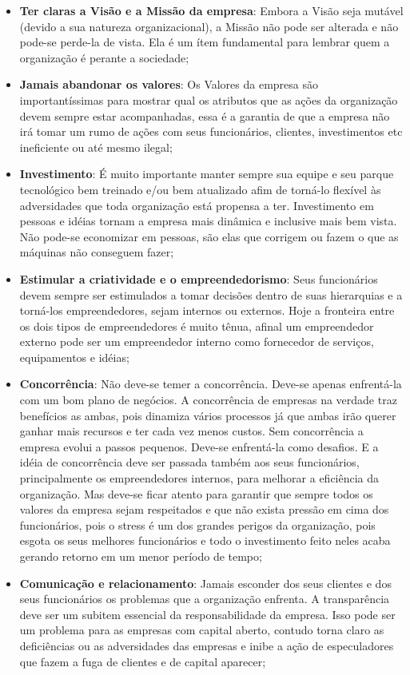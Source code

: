 \documentclass[12pt,a4paper]{article}
\begin{document}
\begin{itemize}

	\item \textbf{Ter claras a Visão e a Missão da empresa}: Embora a Visão seja mutável (devido a sua natureza organizacional), a Missão não pode ser alterada e não pode-se perde-la de vista. Ela é um ítem fundamental para lembrar quem a organização é perante a sociedade;
	
	\item \textbf{Jamais abandonar os valores}: Os Valores da empresa são importantíssimas para mostrar qual os atributos que as ações da organização devem sempre estar acompanhadas, essa é a garantia de que a empresa não irá tomar um rumo de ações com seus funcionários, clientes, investimentos etc ineficiente ou até mesmo ilegal;
	
	\item \textbf{Investimento}: É muito importante manter sempre sua equipe e seu parque tecnológico bem treinado e/ou bem atualizado afim de torná-lo flexível às adversidades que toda organização está propensa a ter. Investimento em pessoas e idéias tornam a empresa mais dinâmica e inclusive mais bem vista. Não pode-se economizar em pessoas, são elas que corrigem ou fazem o que as máquinas não conseguem fazer;
	
	\item \textbf{Estimular a criatividade e o empreendedorismo}: Seus funcionários devem sempre ser estimulados a tomar decisões dentro de suas hierarquias e a torná-los empreendedores, sejam internos ou externos. Hoje a fronteira entre os dois tipos de empreendedores é muito tênua, afinal um empreendedor externo pode ser um empreendedor interno como fornecedor de serviços, equipamentos e idéias;

	\item \textbf{Concorrência}: Não deve-se temer a concorrência. Deve-se apenas enfrentá-la com um bom plano de negócios. A concorrência de empresas na verdade traz benefícios as ambas, pois dinamiza vários processos já que ambas irão querer ganhar mais recursos e ter cada vez menos custos. Sem concorrência a empresa evolui a passos pequenos. Deve-se enfrentá-la como desafios. E a idéia de concorrência deve ser passada também aos seus funcionários, principalmente os empreendedores internos, para melhorar a eficiência da organização. Mas deve-se ficar atento para garantir que sempre todos os valores da empresa sejam respeitados e que não exista pressão em cima dos funcionários, pois o stress é um dos grandes perigos da organização, pois esgota os seus melhores funcionários e todo o investimento feito neles acaba gerando retorno em um menor período de tempo;

	\item \textbf{Comunicação e relacionamento}: Jamais esconder dos seus clientes e dos seus funcionários os problemas que a organização enfrenta. A transparência deve ser um subitem essencial da responsabilidade da empresa. Isso pode ser um problema para as empresas com capital aberto, contudo torna claro as deficiências ou as adversidades das empresas e inibe a ação de especuladores que fazem a fuga de clientes e de capital aparecer;

\end{itemize}
\end{document}
